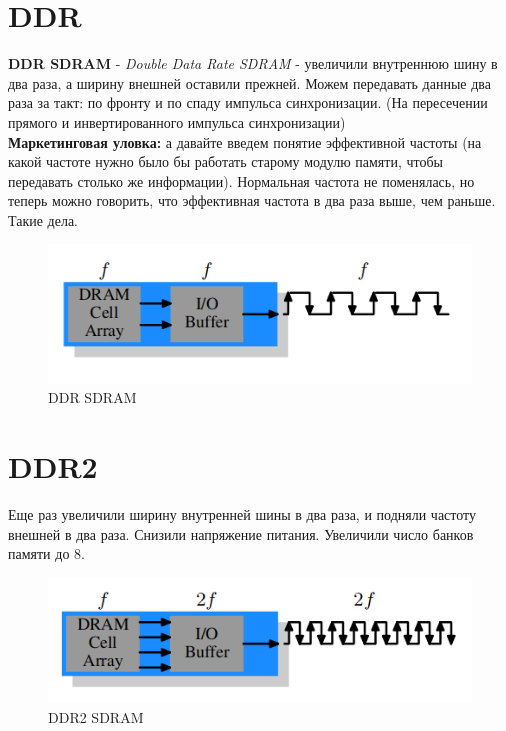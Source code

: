\documentclass[12pt, a4paper]{article}
\begin{document}
\section{DDR}
\textbf{DDR SDRAM} - \textit{Double Data Rate SDRAM} - увеличили внутреннюю шину в два раза, а ширину внешней оставили прежней. Можем передавать данные два раза за такт: по фронту и по спаду импульса синхронизации. (На пересечении прямого и инвертированного импульса синхронизации)\\
\textbf{Маркетинговая уловка:} а давайте введем понятие эффективной частоты (на какой частоте нужно было бы работать старому модулю памяти, чтобы передавать столько же информации). Нормальная частота не поменялась, но теперь можно говорить, что эффективная частота в два раза выше, чем раньше. Такие дела.
\begin{figure}[h]
    \centering
    \includegraphics[scale=0.6]{./images/DDR_SDRAM.png}
    \caption{DDR SDRAM}
    \label{fig:DDR_SDRAM}
\end{figure}
\section{DDR2}
Еще раз увеличили ширину внутренней шины в два раза, и подняли частоту внешней в два раза. Снизили напряжение питания. Увеличили число банков памяти до 8.
\begin{figure}[h]
    \centering
    \includegraphics[scale=0.6]{./images/DDR2_SDRAM.png}
    \caption{DDR2 SDRAM}
    \label{fig:DDR2_SDRAM}
\end{figure}
\end{document}
